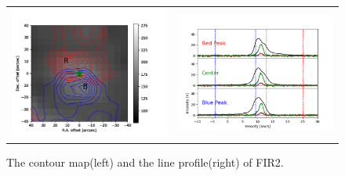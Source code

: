 \begin{figure}[h!]
	\begin{center}
		\begin{tabular}{cc}
			\includegraphics[width=7cm]{Orion_12CO2-1_FIR2_rbcontour_400_modified.png} &   \includegraphics[width=7cm]{Orion_12CO2-1_FIR2_line_profile_400.png} \\
		\end{tabular}
		\caption{The contour map(left) and the line profile(right) of FIR2. }
		\label{fig:FIR221}
	\end{center}
\end{figure}

